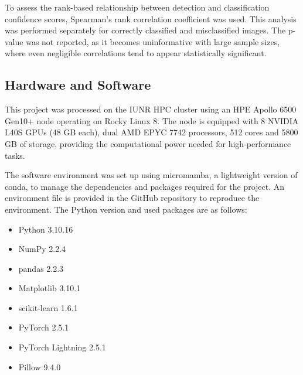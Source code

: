     To assess the rank-based relationship between detection and classification confidence scores, Spearman's rank correlation coefficient was used.
    This analysis was performed separately for correctly classified and misclassified images.
    The p-value was not reported, as it becomes uninformative with large sample sizes, where even negligible correlations tend to appear statistically significant.

    \subsection{Hardware and Software}
    This project was processed on the \ac{IUNR} \ac{HPC} cluster using an HPE Apollo 6500 Gen10+ node operating on Rocky Linux 8.
    The node is equipped with 8 NVIDIA L40S \acp{GPU} (48 \ac{GB} each), dual AMD EPYC 7742 processors, 512 cores and 5800 \ac{GB} of storage, providing the computational power needed for high-performance tasks.

    The software environment was set up using micromamba, a lightweight version of conda, to manage the dependencies and packages required for the project.
    An environment file is provided in the GitHub repository to reproduce the environment.
    The Python version and used packages are as follows: 

    \begin{itemize}
        \item Python 3.10.16
        \item NumPy 2.2.4
        \item pandas 2.2.3
        \item Matplotlib 3.10.1
        \item scikit-learn 1.6.1
        \item PyTorch 2.5.1
        \item PyTorch Lightning 2.5.1
        \item Pillow 9.4.0
    \end{itemize}
